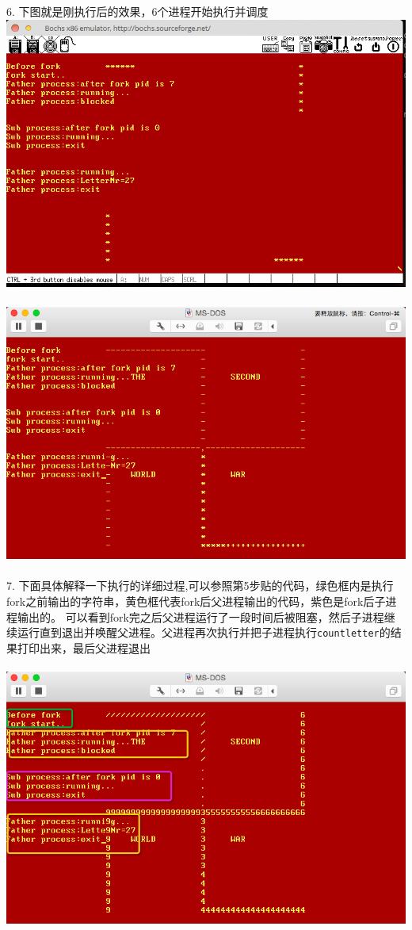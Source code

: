 \documentclass[a4paper]{article}
\begin{document}
{6. 下图就是刚执行后的效果，6个进程开始执行并调度
{\center\includegraphics[scale=0.45]{Illustrations/fork_begin.png}}\\\\
{\center\includegraphics[scale=0.45]{illustrations/fork_done.png}}\\\\
7. 下面具体解释一下执行的详细过程,可以参照第5步贴的代码，绿色框内是执行fork之前输出的字符串，黄色框代表fork后父进程输出的代码，紫色是fork后子进程输出的。
可以看到fork完之后父进程运行了一段时间后被阻塞，然后子进程继续运行直到退出并唤醒父进程。父进程再次执行并把子进程执行\verb|countletter|的结果打印出来，最后父进程退出
\\\\
{\center\includegraphics[scale=0.45]{illustrations/intro.png}}\\\\
}
\end{document}
